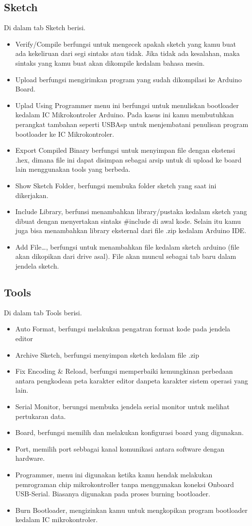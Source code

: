 \subsection{Sketch}
Di dalam tab Sketch berisi.
\begin{itemize}
\item Verify/Compile berfungsi untuk mengecek apakah sketch yang kamu buat ada kekeliruan dari segi sintaks atau tidak. Jika tidak  ada kesalahan, maka sintaks yang kamu buat akan dikompile kedalam bahasa mesin.
\item Upload berfungsi mengirimkan program yang sudah dikompilasi ke Arduino Board.
\item Uplad Using Programmer menu ini berfungsi untuk menuliskan bootloader kedalam IC Mikrokontroler Arduino. Pada kasus ini kamu membutuhkan perangkat tambahan seperti USBAsp untuk menjembatani penulisan program bootloader ke IC Mikrokontroler.
\item Export Compiled Binary berfungsi untuk menyimpan file dengan ekstensi .hex, dimana file ini dapat disimpan sebagai arsip untuk di upload ke board lain menggunakan tools yang berbeda.
\item Show Sketch Folder, berfungsi membuka folder sketch yang saat ini dikerjakan.
\item Include Library, berfunsi menambahkan library/pustaka kedalam sketch yang dibuat dengan menyertakan sintaks \#include di awal kode. Selain itu kamu juga bisa menambahkan library eksternal dari file .zip kedalam Arduino IDE.
\item Add File…, berfungsi untuk menambahkan file kedalam sketch arduino (file akan dikopikan dari drive asal). 
File akan muncul sebagai tab baru dalam jendela sketch.
\end{itemize}
 
\subsection{Tools}
Di dalam tab Tools berisi.
\begin{itemize}
\item Auto Format, berfungsi melakukan pengatran format kode pada jendela editor
\item Archive Sketch, berfungsi menyimpan sketch kedalam file .zip
\item Fix Encoding \& Reload, berfungsi memperbaiki kemungkinan perbedaan antara pengkodean peta karakter editor danpeta karakter sistem operasi yang lain.
\item Serial Monitor, berungsi membuka jendela serial monitor untuk melihat pertukaran data.
\item Board, berfungsi memilih dan melakukan konfigurasi board yang digunakan.
\item Port, memilih port sebbagai kanal komunikasi antara software dengan hardware.
\item Programmer, menu ini digunakan ketika kamu hendak melakukan pemrograman chip mikrokontroller tanpa menggunakan koneksi Onboard USB-Serial.  Biasanya digunakan pada proses burning bootloader.
\item Burn Bootloader, mengizinkan kamu untuk mengkopikan program bootloader kedalam IC mikrokontroler.
\end{itemize}

